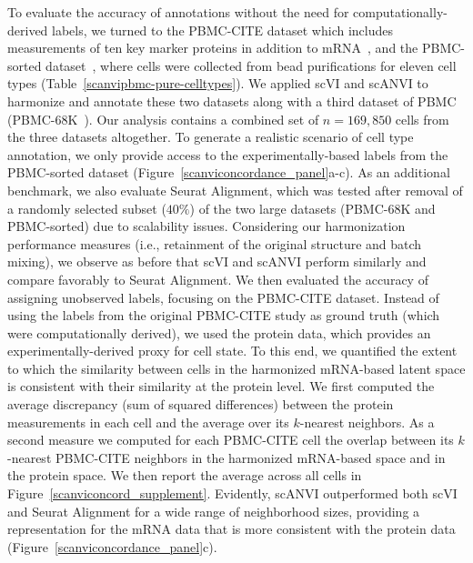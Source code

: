 To evaluate the accuracy of annotations without the need for computationally-derived labels, we turned to the PBMC-CITE dataset which includes measurements of ten key marker proteins in addition to mRNA~\cite{stoeckius2017simultaneous}, and the PBMC-sorted dataset~\cite{zheng2017massively}, where cells were collected from bead purifications for eleven cell types (Table~\ref{scanvipbmc-pure-celltypes}). We applied scVI and scANVI to harmonize and annotate these two datasets along with a third dataset of PBMC (PBMC-68K~\cite{zheng2017massively}). Our analysis contains a combined set of $n=169,850$ cells from the three datasets altogether. To generate a realistic scenario of cell type annotation, we only provide access to the experimentally-based labels from the PBMC-sorted dataset (Figure~\ref{scanviconcordance_panel}a-c). As an additional benchmark, we also evaluate Seurat Alignment, which was tested after removal of a randomly selected subset ($40 \%$) of the two large datasets (PBMC-68K and PBMC-sorted) due to scalability issues. Considering our harmonization performance measures (i.e., retainment of the original structure and batch mixing), we observe as before that scVI and scANVI perform similarly and compare favorably to Seurat Alignment. We then evaluated the accuracy of assigning unobserved labels, focusing on the PBMC-CITE dataset. Instead of using the labels from the original PBMC-CITE study as ground truth (which were computationally derived), we used the protein data, which provides an experimentally-derived proxy for cell state. To this end, we quantified the extent to which the similarity between cells in the harmonized mRNA-based latent space is consistent with their similarity at the protein level. We first computed the average discrepancy (sum of squared differences) between the protein measurements in each cell and the average over its $k$-nearest neighbors. As a second measure we computed for each PBMC-CITE cell the overlap between its $k$-nearest PBMC-CITE neighbors in the harmonized mRNA-based space and in the protein space. We then report the average across all cells in Figure~\ref{scanviconcord_supplement}. Evidently, scANVI outperformed both scVI and Seurat Alignment for a wide range of neighborhood sizes, providing a representation for the mRNA data that is more consistent with the protein data (Figure~\ref{scanviconcordance_panel}c).

 

